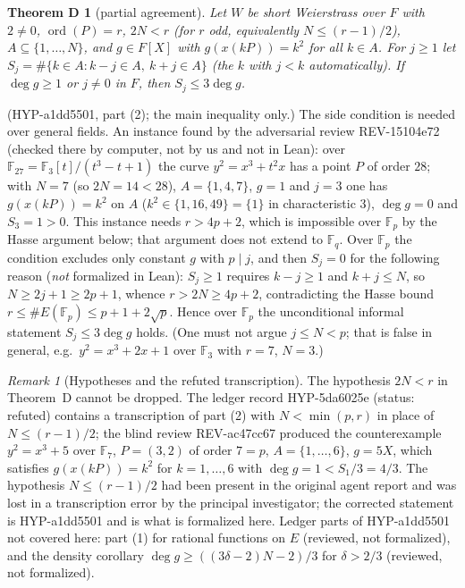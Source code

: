 \documentclass[11pt,a4paper]{article}
\newtheorem*{thmD}{Theorem D}
\theoremstyle{remark}
\newtheorem{remark}{Remark}
\newcommand{\F}{\mathbb{F}}
\begin{document}
\begin{thmD}[partial agreement]\label{thm:D}
Let $W$ be short Weierstrass over $F$ with $2\ne0$, $\operatorname{ord}(P)=r$, $2N<r$ (for $r$ odd, equivalently $N\le (r-1)/2$),
$A\subseteq\{1,\dots,N\}$, and $g\in F[X]$ with $g(x(kP))=k^2$ for all $k\in A$. For $j\ge1$ let
$S_j=\#\{k\in A: k-j\in A,\ k+j\in A\}$ (the $k$ with $j<k$ automatically). If $\deg g\ge1$ or $j\neq0$ in $F$, then
$S_j\le 3\deg g$.
\end{thmD}
(\mbox{HYP-a1dd5501}, part (2); the main inequality only.) The side condition is needed over general fields. An instance found by the adversarial review \mbox{REV-15104e72} (checked there by computer, not by us and not in Lean): over $\F_{27}=\F_3[t]/(t^3-t+1)$ the curve $y^2=x^3+t^2x$ has a point $P$ of order $28$; with $N=7$ (so $2N=14<28$), $A=\{1,4,7\}$, $g=1$ and $j=3$ one has $g(x(kP))=k^2$ on $A$ ($k^2\in\{1,16,49\}=\{1\}$ in characteristic $3$), $\deg g=0$ and $S_3=1>0$. This instance needs $r>4p+2$, which is impossible over $\F_p$ by the Hasse argument below; that argument does not extend to $\F_q$.
Over $\F_p$ the condition excludes only constant $g$ with $p\mid j$, and then $S_j=0$ for the following reason
(\emph{not} formalized in Lean): $S_j\ge1$ requires $k-j\ge1$ and $k+j\le N$, so $N\ge 2j+1\ge 2p+1$, whence $r>2N\ge 4p+2$,
contradicting the Hasse bound $r\le \#E(\F_p)\le p+1+2\sqrt p$. Hence over $\F_p$ the unconditional
informal statement $S_j\le3\deg g$ holds. (One must not argue $j\le N<p$; that is false in general, e.g.\ $y^2=x^3+2x+1$ over $\F_3$ with $r=7$, $N=3$.)

\begin{remark}[Hypotheses and the refuted transcription]
The hypothesis $2N<r$ in Theorem~D cannot be dropped. The ledger record \mbox{HYP-5da6025e} (status:
refuted) contains a transcription of part (2) with $N<\min(p,r)$ in place of $N\le(r-1)/2$; the blind review
\mbox{REV-ac47cc67} produced the counterexample $y^2=x^3+5$ over $\F_7$, $P=(3,2)$ of order $7=p$, $A=\{1,\dots,6\}$,
$g=5X$, which satisfies $g(x(kP))=k^2$ for $k=1,\dots,6$ with $\deg g=1<S_1/3=4/3$. The hypothesis
$N\le(r-1)/2$ had been present in the original agent report and was lost in a transcription error by the
principal investigator; the corrected statement is \mbox{HYP-a1dd5501} and is what is formalized here.
Ledger parts of \mbox{HYP-a1dd5501} not covered here: part (1) for rational functions on $E$ (reviewed, not formalized),
and the density corollary $\deg g\ge((3\delta-2)N-2)/3$ for $\delta>2/3$ (reviewed, not formalized).
\end{remark}
\end{document}
